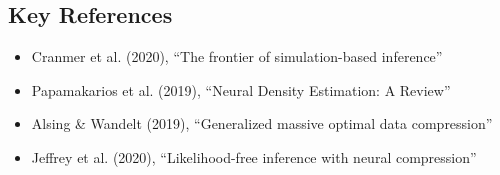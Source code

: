 \documentclass[11pt,a4paper]{article}
\theoremstyle{definition}
\begin{document}
\subsection{Key References}
\begin{itemize}
    \item Cranmer et al. (2020), ``The frontier of simulation-based inference''
    \item Papamakarios et al. (2019), ``Neural Density Estimation: A Review''
    \item Alsing \& Wandelt (2019), ``Generalized massive optimal data compression''
    \item Jeffrey et al. (2020), ``Likelihood-free inference with neural compression''
\end{itemize}
\end{document}
